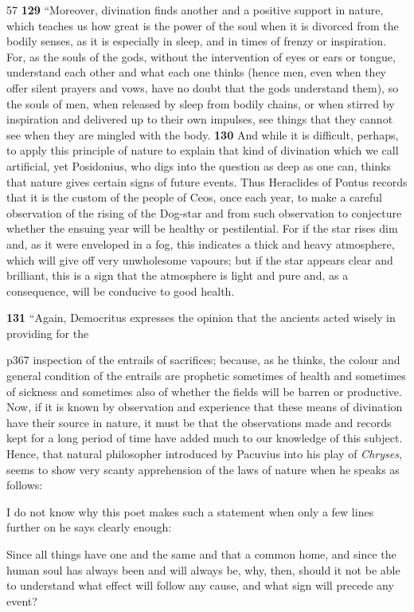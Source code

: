 57
\textbf{129} ``Moreover, divination finds another and a positive support in nature, which teaches us how great is the power of the soul when it is divorced from the bodily senses, as it is especially in sleep, and in times of frenzy or inspiration. For, as the souls of the gods, without the intervention of eyes or ears or tongue, understand each other and what each one thinks (hence men, even when they offer silent prayers and vows, have no doubt that the gods understand them), so the souls of men, when released by sleep from bodily chains, or when stirred by inspiration and delivered up to their own impulses, see things that they cannot see when they are mingled with the body. \textbf{130} And while it is difficult, perhaps, to apply this principle of nature to explain that kind of divination which we call artificial, yet Posidonius, who digs into the question as deep as one can, thinks that nature gives certain signs of future events. Thus Heraclides of Pontus records that it is the custom of the people of Ceos, once each year, to make a careful observation of the rising of the Dog-star and from such observation to conjecture whether the ensuing year will be healthy or pestilential. For if the star rises dim and, as it were enveloped in a fog, this indicates a thick and heavy atmosphere, which will give off very unwholesome vapours; but if the star appears clear and brilliant, this is a sign that the atmosphere is light and pure and, as a consequence, will be conducive to good health.

\textbf{131} ``Again, Democritus expresses the opinion that the ancients acted wisely in providing for the

p367 inspection of the entrails of sacrifices; because, as he thinks, the colour and general condition of the entrails are prophetic sometimes of health and sometimes of sickness and sometimes also of whether the fields will be barren or productive. Now, if it is known by observation and experience that these means of divination have their source in nature, it must be that the observations made and records kept for a long period of time have added much to our knowledge of this subject. Hence, that natural philosopher introduced by Pacuvius into his play of \emph{Chryses}, seems to show very scanty apprehension of the laws of nature when he speaks as follows:

I do not know why this poet makes such a statement when only a few lines further on he says clearly enough:

Since all things have one and the same and that a common home, and since the human soul has always been and will always be, why, then, should it not be able to understand what effect will follow any cause, and what sign will precede any event?


